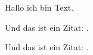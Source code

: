 Hallo ich bin Text.



Und das ist ein Zitat: \citet[12]{Knuth:1997:ACP:260999}.
\begin{quote}
    \blindtext
\end{quote}
Und das ist ein Zitat: \citep[12]{Knuth:1997:ACP:260999}.
\begin{quote}
    \blindtext
\end{quote}
